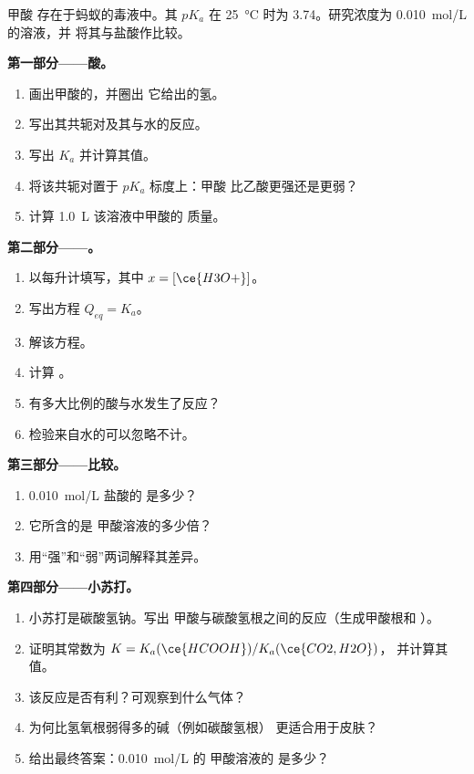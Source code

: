 \begin{problem}
\label{pb:g12:ka-and-pka:1}
甲酸  存在于蚂蚁的毒液中。其 $pK_a$ 在
\qty{25}{\celsius} 时为 3.74。研究浓度为 \qty{0.010}{mol/L} 的溶液，并
将其与盐酸作比较。

\medskip
\noindent\textbf{第一部分——酸。}
\begin{enumerate}
  \item 画出甲酸的，并圈出
        它给出的氢。
  \item 写出其共轭对及其与水的反应。
  \item 写出 $K_a$ 并计算其值。
  \item 将该共轭对置于 $pK_a$ 标度上：甲酸
        比乙酸更强还是更弱？
  \item 计算 \qty{1.0}{L} 该溶液中甲酸的
        质量。
\end{enumerate}

\medskip
\noindent\textbf{第二部分——。}
\begin{enumerate}[resume]
  \item 以每升计填写，其中 $x = [\ce{H3O+}]$。
  \item 写出方程 $Q_{eq} = K_a$。
  \item 解该方程。
  \item 计算 。
  \item 有多大比例的酸与水发生了反应？
  \item 检验来自水的可以忽略不计。
\end{enumerate}

\medskip
\noindent\textbf{第三部分——比较。}
\begin{enumerate}[resume]
  \item \qty{0.010}{mol/L} 盐酸的  是多少？
  \item 它所含的是
        甲酸溶液的多少倍？
  \item 用“强”和“弱”两词解释其差异。
\end{enumerate}

\medskip
\noindent\textbf{第四部分——小苏打。}
\begin{enumerate}[resume]
  \item 小苏打是碳酸氢钠。写出
        甲酸与碳酸氢根之间的反应（生成甲酸根和
        ）。
  \item 证明其常数为 $K = K_a(\ce{HCOOH}) / K_a(\ce{CO2,H2O})$，
        并计算其值。
  \item 该反应是否有利？可观察到什么气体？
  \item 为何比氢氧根弱得多的碱（例如碳酸氢根）
        更适合用于皮肤？
  \item 给出最终答案：\qty{0.010}{mol/L} 的
        甲酸溶液的  是多少？
\end{enumerate}
\end{problem}
